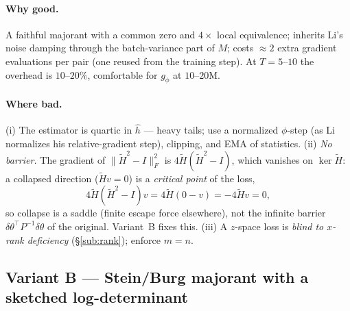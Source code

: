 \documentclass[11pt]{article}
\theoremstyle{plain}
\theoremstyle{definition}
\theoremstyle{remark}
\newcommand{\Fnorm}[1]{\lVert #1 \rVert_F}
\newcommand{\tHess}{\tilde{H}}
\newcommand{\hh}{\hat{h}}
\begin{document}
\paragraph{Why good.} A faithful majorant with a common zero and $4\times$ local
equivalence; inherits Li's noise damping through the batch-variance part of $M$; costs
$\approx2$ extra gradient evaluations per pair (one reused from the training step). At
$T=5$--$10$ the overhead is $10$--$20\%$, comfortable for $g_\phi$ at $10$--$20$M.

\paragraph{Where bad.} (i) The estimator is quartic in $\hh$ --- heavy tails; use a
normalized $\phi$-step (as Li normalizes his relative-gradient step), clipping, and EMA of
statistics. (ii) \emph{No barrier.} The gradient of $\Fnorm{\tHess^2-I}^2$ is
$4\tHess(\tHess^2-I)$, which vanishes on $\ker\tHess$: a collapsed direction ($\tHess v=0$)
is a \emph{critical point} of the loss,
\begin{equation}
  4\tHess(\tHess^2-I)v=4\tHess(0-v)=-4\tHess v=0 ,
\end{equation}
so collapse is a saddle (finite escape force elsewhere), not the infinite barrier
$\delta\theta^{\!\top}P^{-1}\delta\theta$ of the original. Variant~B fixes this. (iii) A
$z$-space loss is \emph{blind to $x$-rank deficiency} (\S\ref{sub:rank}); enforce $m=n$.

\subsection{Variant B --- Stein/Burg majorant with a sketched log-determinant}
\label{sub:B}
\end{document}
